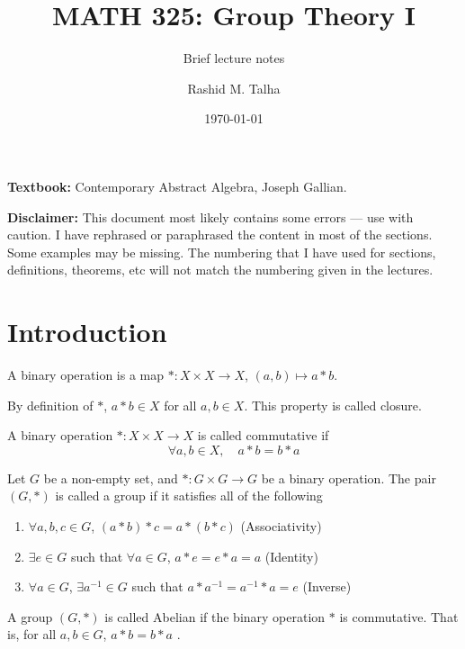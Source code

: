 \documentclass[11pt]{penrose}
\title{MATH 325: Group Theory I}
\subtitle{Brief lecture notes}
\author{Rashid M. Talha}
\affiliation{School of Natural Sciences, NUST}
\date{\today}
\newcommand{\keyword}[1]{\textsf{#1}}
\begin{document}
\maketitle

\textbf{Textbook:} Contemporary Abstract Algebra, Joseph Gallian.

\textbf{Disclaimer:} This document most likely contains some errors --- use with caution. I have rephrased or paraphrased the content in most of the sections. Some examples may be missing. The numbering that I have used for sections, definitions, theorems, etc will not match the numbering given in the lectures.

\section{Introduction}
\begin{ndfn}
    A \keyword{binary operation} is a map $* : X \times X \to X$, $(a,b) \mapsto a * b$.
\end{ndfn}

By definition of $*$, $a * b \in X$ for all $a, b \in X$. This property is called \keyword{closure}.

\begin{ndfn}
    A binary operation $* : X \times X \to X$ is called \keyword{commutative} if
    \begin{equation*}
        \forall a, b \in X, \quad a * b = b * a
    \end{equation*}
\end{ndfn}

\begin{ndfn}
    Let $G$ be a non-empty set, and $* : G \times G \to G$ be a binary operation. The pair $(G, *)$ is called a \keyword{group} if it satisfies all of the following
    \begin{enumerate}[label=(\roman*)]
        \item $\forall a, b, c \in G$, $(a * b) * c = a * (b * c)$ \hfill(\keyword{Associativity})
        \item $\exists e \in G$ such that $\forall a \in G$, $a * e = e * a = a$ \hfill(\keyword{Identity})
        \item $\forall a \in G$, $\exists a^{-1} \in G$ such that $a * a^{-1} = a^{-1} * a = e$ \hfill(\keyword{Inverse})
    \end{enumerate}
\end{ndfn}

\begin{ndfn}
    A group $(G, *)$ is called \keyword{Abelian} if the binary operation $*$ is commutative. That is, for all $a, b \in G$, $a * b = b * a$ .
\end{ndfn}
\end{document}
